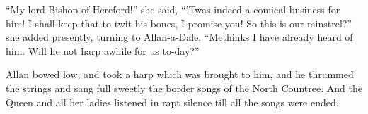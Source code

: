 ``My lord Bishop of Hereford!'' she said, ``'Twas indeed a comical
business for him! I shall keep that to twit his bones, I promise you! So
this is our minstrel?'' she added presently, turning to Allan-a-Dale.
``Methinks I have already heard of him. Will he not harp awhile for us
to-day?''

Allan bowed low, and took a harp which was brought to him, and he
thrummed the strings and sang full sweetly the border songs of the North
Countree. And the Queen and all her ladies listened in rapt silence till
all the songs were ended.
